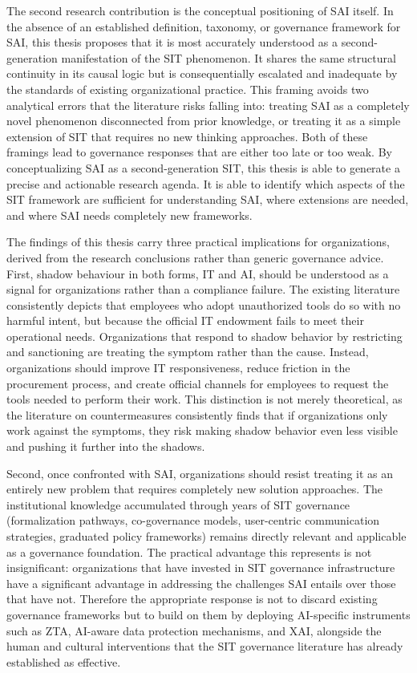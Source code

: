\documentclass[12pt,oneside]{article}
\begin{document}
The second research contribution is the conceptual positioning of \ac{SAI} itself. In the absence of an established definition, taxonomy, or governance framework for \ac{SAI}, this thesis proposes that it is most accurately understood as a second-generation manifestation of the \ac{SIT} phenomenon. It shares the same structural continuity in its causal logic but is consequentially escalated and inadequate by the standards of existing organizational practice. This framing avoids two analytical errors that the literature risks falling into: treating \ac{SAI} as a completely novel phenomenon disconnected from prior knowledge, or treating it as a simple extension of \ac{SIT} that requires no new thinking approaches. Both of these framings lead to governance responses that are either too late or too weak. By conceptualizing \ac{SAI} as a second-generation \ac{SIT}, this thesis is able to generate a precise and actionable research agenda. It is able to identify which aspects of the \ac{SIT} framework are sufficient for understanding \ac{SAI}, where extensions are needed, and where \ac{SAI} needs completely new frameworks.

The findings of this thesis carry three practical implications for organizations, derived from the research conclusions rather than generic governance advice. First, shadow behaviour in both forms, \ac{IT} and \ac{AI}, should be understood as a signal for organizations rather than a compliance failure. The existing literature consistently depicts that employees who adopt unauthorized tools do so with no harmful intent, but because the official \ac{IT} endowment fails to meet their operational needs. Organizations that respond to shadow behavior by restricting and sanctioning are treating the symptom rather than the cause. Instead, organizations should improve \ac{IT} responsiveness, reduce friction in the procurement process, and create official channels for employees to request the tools needed to perform their work. This distinction is not merely theoretical, as the literature on countermeasures consistently finds that if organizations only work against the symptoms, they risk making shadow behavior even less visible and pushing it further into the shadows.

Second, once confronted with \ac{SAI}, organizations should resist treating it as an entirely new problem that requires completely new solution approaches. The institutional knowledge accumulated through years of \ac{SIT} governance (formalization pathways, co-governance models, user-centric communication strategies, graduated policy frameworks) remains directly relevant and applicable as a governance foundation. The practical advantage this represents is not insignificant: organizations that have invested in \ac{SIT} governance infrastructure have a significant advantage in addressing the challenges \ac{SAI} entails over those that have not. Therefore the appropriate response is not to discard existing governance frameworks but to build on them by deploying \ac{AI}-specific instruments such as \ac{ZTA}, AI-aware data protection mechanisms, and \ac{XAI}, alongside the human and cultural interventions that the \ac{SIT} governance literature has already established as effective.
\end{document}
